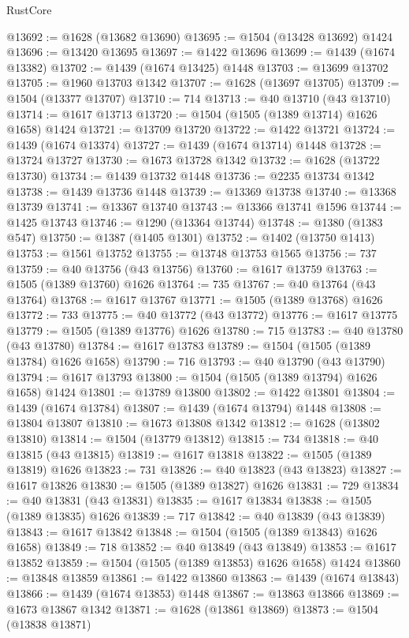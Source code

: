 \begin{lexlean}{RustCore}
\begin{coremodule}
@13692 := @1628 (@13682 @13690)
@13695 := @1504 (@13428 @13692) @1424
@13696 := @13420 @13695
@13697 := @1422 @13696
@13699 := @1439 (@1674 @13382)
@13702 := @1439 (@1674 @13425) @1448
@13703 := @13699 @13702
@13705 := @1960 @13703 @1342
@13707 := @1628 (@13697 @13705)
@13709 := @1504 (@13377 @13707)
@13710 := 714
@13713 := @40 @13710 (@43 @13710)
@13714 := @1617 @13713
@13720 := @1504 (@1505 (@1389 @13714) @1626 @1658) @1424
@13721 := @13709 @13720
@13722 := @1422 @13721
@13724 := @1439 (@1674 @13374)
@13727 := @1439 (@1674 @13714) @1448
@13728 := @13724 @13727
@13730 := @1673 @13728 @1342
@13732 := @1628 (@13722 @13730)
@13734 := @1439 @13732 @1448
@13736 := @2235 @13734 @1342
@13738 := @1439 @13736 @1448
@13739 := @13369 @13738
@13740 := @13368 @13739
@13741 := @13367 @13740
@13743 := @13366 @13741 @1596
@13744 := @1425 @13743
@13746 := @1290 (@13364 @13744)
@13748 := @1380 (@1383 @547)
@13750 := @1387 (@1405 @1301)
@13752 := @1402 (@13750 @1413)
@13753 := @1561 @13752
@13755 := @13748 @13753 @1565
@13756 := 737
@13759 := @40 @13756 (@43 @13756)
@13760 := @1617 @13759
@13763 := @1505 (@1389 @13760) @1626
@13764 := 735
@13767 := @40 @13764 (@43 @13764)
@13768 := @1617 @13767
@13771 := @1505 (@1389 @13768) @1626
@13772 := 733
@13775 := @40 @13772 (@43 @13772)
@13776 := @1617 @13775
@13779 := @1505 (@1389 @13776) @1626
@13780 := 715
@13783 := @40 @13780 (@43 @13780)
@13784 := @1617 @13783
@13789 := @1504 (@1505 (@1389 @13784) @1626 @1658)
@13790 := 716
@13793 := @40 @13790 (@43 @13790)
@13794 := @1617 @13793
@13800 := @1504 (@1505 (@1389 @13794) @1626 @1658) @1424
@13801 := @13789 @13800
@13802 := @1422 @13801
@13804 := @1439 (@1674 @13784)
@13807 := @1439 (@1674 @13794) @1448
@13808 := @13804 @13807
@13810 := @1673 @13808 @1342
@13812 := @1628 (@13802 @13810)
@13814 := @1504 (@13779 @13812)
@13815 := 734
@13818 := @40 @13815 (@43 @13815)
@13819 := @1617 @13818
@13822 := @1505 (@1389 @13819) @1626
@13823 := 731
@13826 := @40 @13823 (@43 @13823)
@13827 := @1617 @13826
@13830 := @1505 (@1389 @13827) @1626
@13831 := 729
@13834 := @40 @13831 (@43 @13831)
@13835 := @1617 @13834
@13838 := @1505 (@1389 @13835) @1626
@13839 := 717
@13842 := @40 @13839 (@43 @13839)
@13843 := @1617 @13842
@13848 := @1504 (@1505 (@1389 @13843) @1626 @1658)
@13849 := 718
@13852 := @40 @13849 (@43 @13849)
@13853 := @1617 @13852
@13859 := @1504 (@1505 (@1389 @13853) @1626 @1658) @1424
@13860 := @13848 @13859
@13861 := @1422 @13860
@13863 := @1439 (@1674 @13843)
@13866 := @1439 (@1674 @13853) @1448
@13867 := @13863 @13866
@13869 := @1673 @13867 @1342
@13871 := @1628 (@13861 @13869)
@13873 := @1504 (@13838 @13871)

\end{coremodule}
\end{lexlean}
